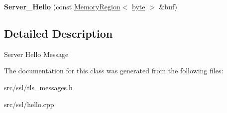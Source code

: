 \begin{DoxyCompactItemize}
\item 
\hypertarget{classBotan_1_1Server__Hello_a75df7046df7d4577f564afad8a62de3c}{{\bfseries Server\-\_\-\-Hello} (const \hyperlink{classBotan_1_1MemoryRegion}{Memory\-Region}$<$ \hyperlink{namespaceBotan_a7d793989d801281df48c6b19616b8b84}{byte} $>$ \&buf)}\label{classBotan_1_1Server__Hello_a75df7046df7d4577f564afad8a62de3c}

\end{DoxyCompactItemize}


\subsection{Detailed Description}
Server Hello Message 

The documentation for this class was generated from the following files\-:\begin{DoxyCompactItemize}
\item 
src/ssl/tls\-\_\-messages.\-h\item 
src/ssl/hello.\-cpp\end{DoxyCompactItemize}
